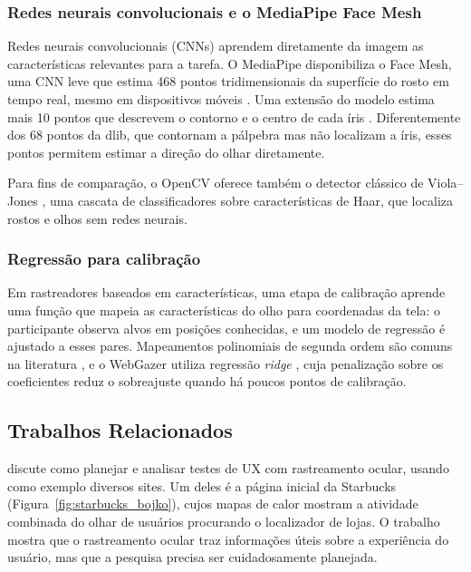 \documentclass[sigconf, nonacm, language=english, language=portuguese, natbib=false]{acmart}
\begin{document}
\subsubsection{Redes neurais convolucionais e o MediaPipe Face Mesh}
Redes neurais convolucionais (CNNs) aprendem diretamente da imagem as características relevantes para a tarefa. O MediaPipe \cite{lugaresi2019mediapipe} disponibiliza o Face Mesh, uma CNN leve que estima 468 pontos tridimensionais da superfície do rosto em tempo real, mesmo em dispositivos móveis \cite{kartynnik2019}. Uma extensão do modelo estima mais 10 pontos que descrevem o contorno e o centro de cada íris \cite{ablavatski2020}. Diferentemente dos 68 pontos da dlib, que contornam a pálpebra mas não localizam a íris, esses pontos permitem estimar a direção do olhar diretamente.

Para fins de comparação, o OpenCV oferece também o detector clássico de Viola--Jones \cite{viola2001}, uma cascata de classificadores sobre características de Haar, que localiza rostos e olhos sem redes neurais.

\subsubsection{Regressão para calibração}
Em rastreadores baseados em características, uma etapa de calibração aprende uma função que mapeia as características do olho para coordenadas da tela: o participante observa alvos em posições conhecidas, e um modelo de regressão é ajustado a esses pares. Mapeamentos polinomiais de segunda ordem são comuns na literatura \cite{holmqvist2011eye}, e o WebGazer utiliza regressão \emph{ridge} \cite{papoutsaki2016webgazer}, cuja penalização sobre os coeficientes reduz o sobreajuste quando há poucos pontos de calibração.

\subsection{Trabalhos Relacionados}

\textcite{bojko2005eye} discute como planejar e analisar testes de UX com rastreamento ocular, usando como exemplo diversos sites. Um deles é a página inicial da Starbucks (Figura~\ref{fig:starbucks_bojko}), cujos mapas de calor mostram a atividade combinada do olhar de usuários procurando o localizador de lojas. O trabalho mostra que o rastreamento ocular traz informações úteis sobre a experiência do usuário, mas que a pesquisa precisa ser cuidadosamente planejada.
\end{document}
